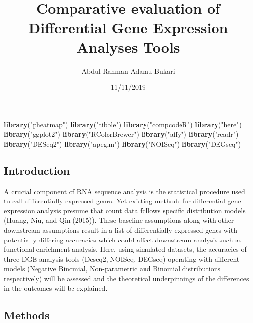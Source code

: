 \documentclass[]{article}
\title{Comparative evaluation of Differential Gene Expression Analyses Tools}
\author{Abdul-Rahman Adamu Bukari}
\date{11/11/2019}
\newenvironment{Shaded}{\begin{snugshade}}{\end{snugshade}}
\newcommand{\KeywordTok}[1]{\textcolor[rgb]{0.13,0.29,0.53}{\textbf{#1}}}
\newcommand{\NormalTok}[1]{#1}
\newcommand{\StringTok}[1]{\textcolor[rgb]{0.31,0.60,0.02}{#1}}
\begin{document}
\maketitle


\begin{Shaded}
\begin{Highlighting}[]
\KeywordTok{library}\NormalTok{(}\StringTok{"pheatmap"}\NormalTok{)}
\KeywordTok{library}\NormalTok{(}\StringTok{"tibble"}\NormalTok{)}
\KeywordTok{library}\NormalTok{(}\StringTok{"compcodeR"}\NormalTok{)}
\KeywordTok{library}\NormalTok{(}\StringTok{"here"}\NormalTok{)}
\KeywordTok{library}\NormalTok{(}\StringTok{"ggplot2"}\NormalTok{)}
\KeywordTok{library}\NormalTok{(}\StringTok{"RColorBrewer"}\NormalTok{)}
\KeywordTok{library}\NormalTok{(}\StringTok{"affy"}\NormalTok{)}
\KeywordTok{library}\NormalTok{(}\StringTok{"readr"}\NormalTok{)}
\KeywordTok{library}\NormalTok{(}\StringTok{"DESeq2"}\NormalTok{)}
\KeywordTok{library}\NormalTok{(}\StringTok{"apeglm"}\NormalTok{)}
\KeywordTok{library}\NormalTok{(}\StringTok{"NOISeq"}\NormalTok{)}
\KeywordTok{library}\NormalTok{(}\StringTok{"DEGseq"}\NormalTok{)}
\end{Highlighting}
\end{Shaded}

\hypertarget{introduction}{%
\subsection{Introduction}\label{introduction}}

A crucial component of RNA sequence analysis is the statistical
procedure used to call differentially expressed genes. Yet existing
methods for differential gene expression analysis presume that count
data follows specific distribution models (Huang, Niu, and Qin (2015)).
These baseline assumptions along with other downstream assumptions
result in a list of differentially expressed genes with potentially
differing accuracies which could affect downstream analysis such as
functional enrichment analysis. Here, using simulated datasets, the
accuracies of three DGE analysis tools (Deseq2, NOISeq, DEGseq)
operating with different models (Negative Binomial, Non-parametric and
Binomial distributions respectively) will be assessed and the
theoretical underpinnings of the differences in the outcomes will be
explained.

\hypertarget{methods}{%
\subsection{Methods}\label{methods}}
\end{document}
